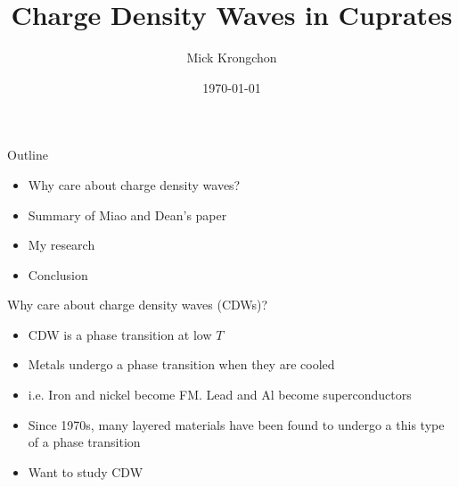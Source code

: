\documentclass{beamer}
\title[]{Charge Density Waves in Cuprates}
\author{Mick Krongchon}
\institute{University of Illinois at Urbana-Champaign}
\date{\today}
\begin{document}
\begin{frame}
\titlepage
\end{frame}

\begin{frame}{Outline}
\begin{itemize}
\item Why care about charge density waves?
\item Summary of Miao and Dean's paper
\item My research
\item Conclusion
\end{itemize}
\end{frame}

\begin{frame}{Why care about charge density waves (CDWs)?}
\begin{itemize}
\item CDW is a phase transition at low $T$
\item Metals undergo a phase transition when they are cooled
\item i.e. Iron and nickel become FM. Lead and Al become superconductors
\item Since 1970s, many layered materials have been found to undergo a this type of a phase transition
\item Want to study CDW
\end{itemize}
\end{frame}

\end{document}
